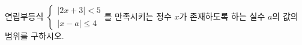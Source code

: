연립부등식 $\begin{cases} |2x+3|<5 \\ |x-a|\le 4 \end{cases}$를 만족시키는 정수 $x$가 존재하도록 하는 실수 $a$의 값의 범위를 구하시오.
